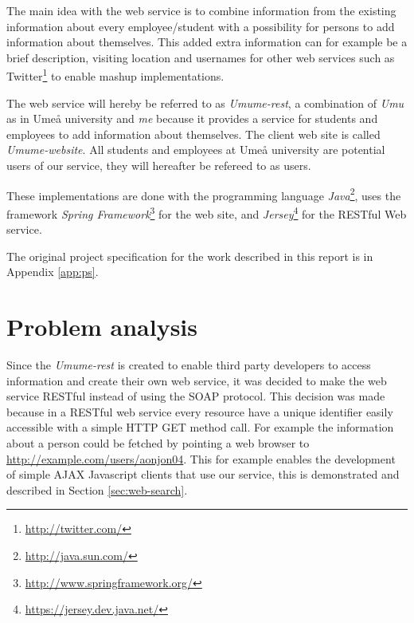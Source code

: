 \documentclass[titlepage, twocolumn, a4paper, 10pt]{article}
\begin{document}
The main idea with the web service is to combine information from the
existing information about every employee/student with a possibility
for persons to add information about themselves. This added extra
information can for example be a brief description, visiting location
and usernames for other web services such as
Twitter\footnote{\url{http://twitter.com/}} to enable mashup
implementations.

The web service will hereby be referred to as \textit{Umume-rest}, a
combination of \textit{Umu} as in Umeå university and \textit{me}
because it provides a service for students and employees to add
information about themselves. The client web site is called
\textit{Umume-website}. All students and employees at Umeå university
are potential users of our service, they will hereafter be refereed to
as users.

These implementations are done with the programming language
\textit{Java}\footnote{\url{http://java.sun.com/}}, uses the framework
\textit{Spring
  Framework}\footnote{\url{http://www.springframework.org/}} for the
web site, and
\textit{Jersey}\footnote{\url{https://jersey.dev.java.net/}} for the
RESTful Web service.

The original project specification for the work described in this
report is in Appendix \ref{app:ps}.

\section{Problem analysis}\label{sec:problem-analysis}
Since the \textit{Umume-rest} is created to enable third party
developers to access information and create their own web service, it
was decided to make the web service RESTful instead of using the SOAP
protocol. This decision was made because in a RESTful web service
every resource have a unique identifier easily accessible with a
simple HTTP GET method call. For example the information about a
person could be fetched by pointing a web browser to
\url{http://example.com/users/aonjon04}. This for example enables the
development of simple AJAX Javascript clients that use our service,
this is demonstrated and described in Section \ref{sec:web-search}.
\end{document}
